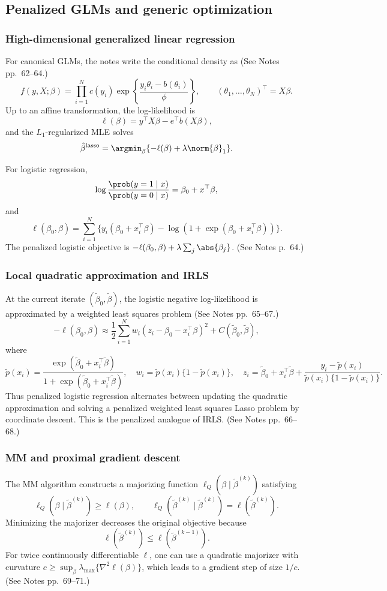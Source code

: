 \subsection{Penalized GLMs and generic optimization}
\subsubsection{High-dimensional generalized linear regression}
For canonical GLMs, the notes write the conditional density as (See Notes pp.~62--64.)
\[
f(y,X;\beta)
=\prod_{i=1}^N
c(y_i)\exp\left\{\frac{y_i\theta_i-b(\theta_i)}{\phi}\right\},
\qquad
(\theta_1,\ldots,\theta_N)^\top=X\beta.
\]
Up to an affine transformation, the log-likelihood is
\[
\ell(\beta)=y^\top X\beta-e^\top b(X\beta),
\]
and the $L_1$-regularized MLE solves
\[
\hat\beta^{\mathrm{lasso}}
=\argmin_\beta\{-\ell(\beta)+\lambda\norm{\beta}_1\}.
\]

For logistic regression,
\[
\log\frac{\prob(y=1\mid x)}{\prob(y=0\mid x)}
=\beta_0+x^\top\beta,
\]
and
\[
\ell(\beta_0,\beta)
=\sum_{i=1}^N
\{y_i(\beta_0+x_i^\top\beta)-\log(1+\exp(\beta_0+x_i^\top\beta))\}.
\]
The penalized logistic objective is $-\ell(\beta_0,\beta)+\lambda\sum_j\abs{\beta_j}$. (See Notes p.~64.)

\subsubsection{Local quadratic approximation and IRLS}
At the current iterate $(\tilde\beta_0,\tilde\beta)$, the logistic negative log-likelihood is approximated by a weighted least squares problem (See Notes pp.~65--67.)
\[
-\ell(\beta_0,\beta)
\approx
\frac12\sum_{i=1}^N
w_i(z_i-\beta_0-x_i^\top\beta)^2
+C(\tilde\beta_0,\tilde\beta),
\]
where
\[
\tilde p(x_i)=
\frac{\exp(\tilde\beta_0+x_i^\top\tilde\beta)}
{1+\exp(\tilde\beta_0+x_i^\top\tilde\beta)},
\quad
w_i=\tilde p(x_i)\{1-\tilde p(x_i)\},
\quad
z_i=\tilde\beta_0+x_i^\top\tilde\beta+
\frac{y_i-\tilde p(x_i)}{\tilde p(x_i)\{1-\tilde p(x_i)\}}.
\]
Thus penalized logistic regression alternates between updating the quadratic approximation and solving a penalized weighted least squares Lasso problem by coordinate descent. This is the penalized analogue of IRLS. (See Notes pp.~66--68.)

\subsubsection{MM and proximal gradient descent}
The MM algorithm constructs a majorizing function $\ell_Q(\beta\mid\tilde\beta^{(k)})$ satisfying
\[
\ell_Q(\beta\mid\tilde\beta^{(k)})\ge \ell(\beta),
\qquad
\ell_Q(\tilde\beta^{(k)}\mid\tilde\beta^{(k)})
=\ell(\tilde\beta^{(k)}).
\]
Minimizing the majorizer decreases the original objective because
\[
\ell(\tilde\beta^{(k)})
\le \ell(\tilde\beta^{(k-1)}).
\]
For twice continuously differentiable $\ell$, one can use a quadratic majorizer with curvature $c\ge \sup_\beta \lambda_{\max}\{\nabla^2\ell(\beta)\}$, which leads to a gradient step of size $1/c$. (See Notes pp.~69--71.)

